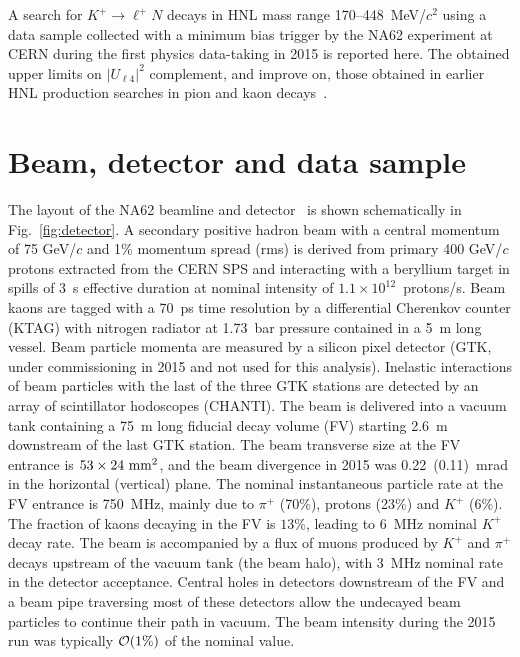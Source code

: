 \documentclass[11pt]{article}
\begin{document}
A search for $K^+\to\ell^+N$ decays in HNL mass range 170--448~MeV/$c^2$ using a data sample collected with a minimum bias trigger by the NA62 experiment at CERN during the first physics data-taking in 2015 is reported here. The obtained upper limits on $|U_{\ell4}|^2$ complement, and improve on, those obtained in earlier HNL production searches in pion and kaon decays~\cite{br92,ag17,ya84,ar15,la17}.

\section{Beam, detector and data sample}
\label{sec:detector}

The layout of the NA62 beamline and detector~\cite{na62-detector} is shown schematically in Fig.~\ref{fig:detector}. A secondary positive hadron beam with a central momentum of 75 GeV/$c$ and 1\% momentum spread (rms) is derived from primary 400 GeV/$c$ protons extracted from the CERN SPS and interacting with a beryllium target in spills of 3~s effective duration at nominal intensity of $1.1\times 10^{12}$~protons/s. Beam kaons are tagged with a 70~ps time resolution by a differential Cherenkov counter (KTAG) with nitrogen radiator at 1.73~bar pressure contained in a 5~m long vessel. Beam particle momenta are measured by a silicon pixel detector (GTK, under commissioning in 2015 and not used for this analysis). Inelastic interactions of beam particles with the last of the three GTK stations are detected by an array of scintillator hodoscopes (CHANTI). The beam is delivered into a vacuum tank containing a 75~m long fiducial decay volume (FV) starting 2.6~m downstream of the last GTK station. The beam transverse size at the FV entrance is $53\times24~{\rm mm}^2$, and the beam divergence in 2015 was 0.22~(0.11)~mrad in the horizontal (vertical) plane. The nominal instantaneous particle rate at the FV entrance is 750~MHz, mainly due to $\pi^+$ (70\%), protons (23\%) and $K^+$ (6\%). The fraction of kaons decaying in the FV is $13\%$, leading to 6~MHz nominal $K^+$ decay rate. The beam is accompanied by a flux of muons produced by $K^+$ and $\pi^+$ decays upstream of the vacuum tank (the beam halo), with 3~MHz nominal rate in the detector acceptance. Central holes in detectors downstream of the FV and a beam pipe traversing most of these detectors allow the undecayed beam particles to continue their path in vacuum.
The beam intensity during the 2015 run was typically ${\cal O}(1\%)$ of the nominal value.
\end{document}
